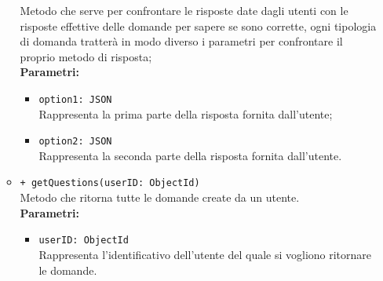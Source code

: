 \begin{itemize}
\begin{itemize}
	Metodo che serve per confrontare le risposte date dagli utenti con le risposte effettive delle domande per sapere se sono corrette, ogni tipologia di domanda tratterà in modo diverso i parametri per confrontare il proprio metodo di risposta; \\
	\textbf{Parametri:}
		\begin{itemize}
			\item \texttt{option1: JSON} \\
			Rappresenta la prima parte della risposta fornita dall'utente;
			\item \texttt{option2: JSON} \\
			Rappresenta la seconda parte della risposta fornita dall'utente.
		\end{itemize}
	\item \texttt{+ getQuestions(userID: ObjectId)}\\
	Metodo che ritorna tutte le domande create da un utente.\\
	\textbf{Parametri:}
	\begin{itemize}
		\item \texttt{userID: ObjectId}\\
		Rappresenta l'identificativo dell'utente del quale si vogliono ritornare le domande.
	\end{itemize}
	\end{itemize}
\end{itemize}
